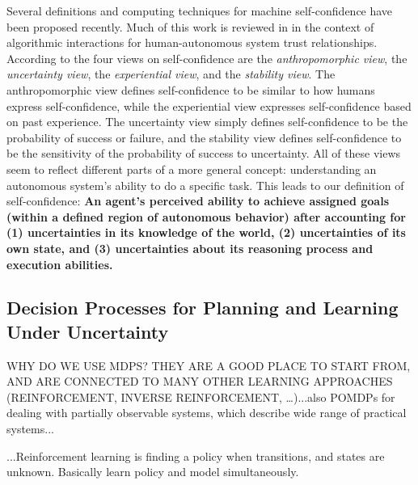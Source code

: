 Several definitions and computing techniques for machine self-confidence have been proposed recently. Much of this work is reviewed in \cite{Israelsen2017-ym} in the context of algorithmic interactions for human-autonomous system trust relationships. %
According to \cite{Sweet2016-tz} the four views on self-confidence are the \textit{anthropomorphic view}, the \textit{uncertainty view}, the \textit{experiential view}, and the \textit{stability view}. The anthropomorphic view defines self-confidence to be similar to how humans express self-confidence, while the experiential view expresses self-confidence based on past experience. The uncertainty view simply defines self-confidence to be the probability of success or failure, and the stability view defines self-confidence to be the sensitivity of the probability of success to uncertainty. All of these views seem to reflect different parts of a more general concept: understanding an autonomous system's ability to do a specific task. 
This leads to our definition of self-confidence: \textbf{An agent's perceived ability to achieve assigned goals (within a defined region of autonomous behavior) after accounting for (1) uncertainties in its knowledge of the world, (2) uncertainties of its own state, and (3) uncertainties about its reasoning process and execution abilities.}


\subsection{Decision Processes for Planning and Learning Under Uncertainty}
WHY DO WE USE MDPS? THEY ARE A GOOD PLACE TO START FROM, AND ARE CONNECTED TO MANY OTHER LEARNING APPROACHES (REINFORCEMENT, INVERSE REINFORCEMENT, \ldots)...also POMDPs for dealing with partially observable systems, which describe wide range of practical systems... 


...Reinforcement learning is finding a policy when transitions, and states are unknown. Basically learn policy and model simultaneously. %

